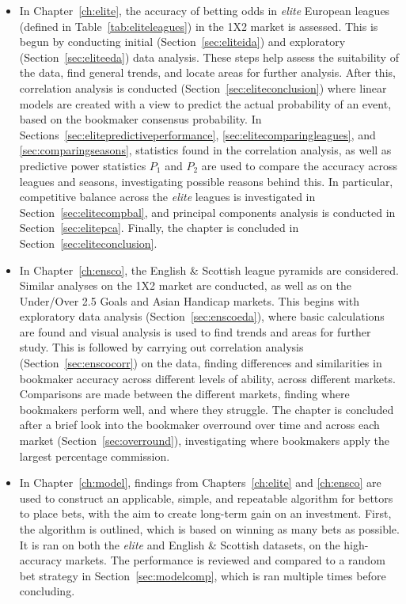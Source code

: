\documentclass[a4paper,10pt]{report}
\begin{document}
\begin{itemize}
	\item In Chapter~\ref{ch:elite}, the accuracy of betting odds in \textit{elite} European leagues (defined in Table~\ref{tab:eliteleagues}) in the 1X2 market is assessed. This is begun by conducting initial (Section~\ref{sec:eliteida}) and exploratory (Section~\ref{sec:eliteeda}) data analysis. These steps help assess the suitability of the data, find general trends, and locate areas for further analysis. After this, correlation analysis is conducted (Section~\ref{sec:eliteconclusion}) where linear models are created with a view to predict the actual probability of an event, based on the bookmaker consensus probability. In Sections~\ref{sec:elitepredictiveperformance}, \ref{sec:elitecomparingleagues}, and \ref{sec:comparingseasons}, statistics found in the correlation analysis, as well as predictive power statistics $P_1$ and $P_2$ are used to compare the accuracy across leagues and seasons, investigating possible reasons behind this. In particular, competitive balance across the \textit{elite} leagues is investigated in Section~\ref{sec:elitecompbal}, and principal components analysis is conducted in Section~\ref{sec:elitepca}. Finally, the chapter is concluded in Section~\ref{sec:eliteconclusion}. 

	\item In Chapter~\ref{ch:ensco}, the English \& Scottish league pyramids are considered. Similar analyses on the 1X2 market are conducted, as well as on the Under/Over 2.5 Goals and Asian Handicap markets. This begins with exploratory data analysis (Section~\ref{sec:enscoeda}), where basic calculations are found and visual analysis is used to find trends and areas for further study. This is followed by carrying out correlation analysis (Section~\ref{sec:enscocorr}) on the data, finding differences and similarities in bookmaker accuracy across different levels of ability, across different markets. Comparisons are made between the different markets, finding where bookmakers perform well, and where they struggle. The chapter is concluded after a brief look into the bookmaker overround over time and across each market (Section~\ref{sec:overround}), investigating where bookmakers apply the largest percentage commission.

	\item In Chapter~\ref{ch:model}, findings from Chapters~\ref{ch:elite} and \ref{ch:ensco} are used to construct an applicable, simple, and repeatable algorithm for bettors to place bets, with the aim to create long-term gain on an investment. First, the algorithm is outlined, which is based on winning as many bets as possible. It is ran on both the \textit{elite} and English \& Scottish datasets, on the high-accuracy markets. The performance is reviewed and compared to a random bet strategy in Section~\ref{sec:modelcomp}, which is ran multiple times before concluding. 
\end{itemize}
\end{document}
